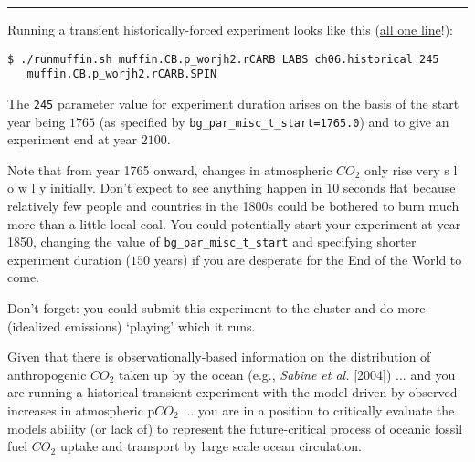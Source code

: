 \vspace{1mm}
\noindent\rule{4cm}{0.1mm}
\vspace{2mm}

\noindent Running a transient historically-forced experiment looks like this (\uline{all one line}!):
\vspace{-2pt}\small\begin{verbatim}
$ ./runmuffin.sh muffin.CB.p_worjh2.rCARB LABS ch06.historical 245
   muffin.CB.p_worjh2.rCARB.SPIN
\end{verbatim}\normalsize\vspace{-2pt}
The \texttt{245} parameter value for experiment duration arises on the basis of the start year being \(1765\) (as specified by \texttt{\small bg\_par\_misc\_t\_start=1765.0}) and to give an experiment end at year \(2100\).

\vspace{1mm}

Note that from year 1765 onward, changes in atmospheric \(CO_{2}\) only rise very s l o w l y initially. Don't expect to see anything happen in 10 seconds flat because relatively few people and countries in the 1800s could be bothered to burn much more than a little local coal. You could potentially start your experiment at year 1850, changing the value of \texttt{\small bg\_par\_misc\_t\_start} and specifying shorter experiment duration (\(150\) years) if you are desperate for the End of the World to come.

Don’t forget: you could submit this experiment to the cluster and do more (idealized emissions) ‘playing’ which it runs.


\noindent Given that there is observationally-based information on the distribution of anthropogenic \(CO_{2}\) taken up by the ocean (e.g., \textit{Sabine et al.} [2004]) ... and you are running a historical transient experiment with the model driven by observed increases in atmospheric p\(CO_{2}\) ... you are in a position to critically evaluate the models ability (or lack of) to represent the future-critical process of oceanic fossil fuel \(CO_{2}\) uptake and transport by large scale ocean circulation.

\vspace{1mm}

